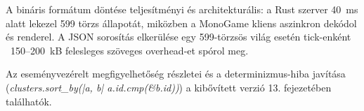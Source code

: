 A bináris formátum döntése teljesítményi és architekturális: a Rust szerver 40~ms alatt lekezel 599 törzs állapotát, miközben a MonoGame kliens aszinkron dekódol és renderel. A JSON sorosítás elkerülése egy 599-törzsös világ esetén tick-enként ~150--200~kB felesleges szöveges overhead-et spórol meg.

Az eseményvezérelt megfigyelhetőség részletei és a determinizmus-hiba javítása (\textit{clusters.sort\_by(|a, b| a.id.cmp(\&b.id))}) a kibővített verzió 13. fejezetében találhatók.
